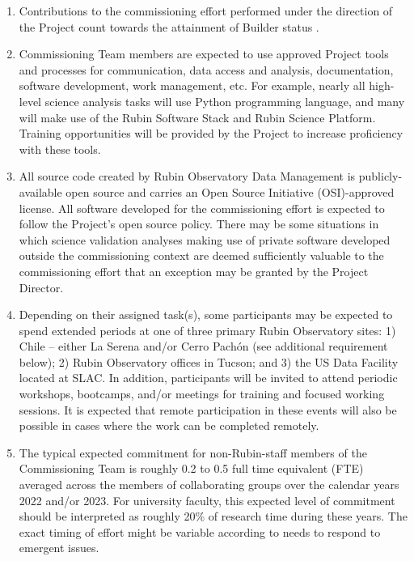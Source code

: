\documentclass[SE,authoryear,toc]{lsstdoc}
\begin{document}
\begin{enumerate}
\item Contributions to the commissioning effort performed under the direction of the Project count towards the attainment of Builder status .

\item Commissioning Team members are expected to use approved Project tools and processes for communication, data access and analysis, documentation, software development, work management, etc. For example, nearly all high-level science analysis tasks will use Python programming language, and many will make use of the Rubin Software Stack and Rubin Science Platform. Training opportunities will be provided by the Project to increase proficiency with these tools. 

\item All source code created by Rubin Observatory Data Management is publicly-available open source and carries an Open Source Initiative (OSI)-approved license. All software developed for the commissioning effort is expected to follow the Project's open source policy. There may be some situations in which science validation analyses making use of private software developed outside the commissioning context are deemed sufficiently valuable to the commissioning effort that an exception may be granted by the Project Director. 

\item Depending on their assigned task(s), some participants may be expected to spend extended periods at one of three primary Rubin Observatory sites: 1) Chile -- either La Serena and/or Cerro Pach\'{o}n (see additional requirement below); 2) Rubin Observatory offices in Tucson; and 3) the US Data Facility located at SLAC. In addition, participants will be invited to attend periodic workshops, bootcamps, and/or meetings for training and focused working sessions. It is expected that remote participation in these events will also be possible in cases where the work can be completed remotely.


\item The typical expected commitment for non-Rubin-staff members of the Commissioning Team is roughly 0.2 to 0.5 full time equivalent (FTE) averaged across the members of collaborating groups over the calendar years 2022 and/or 2023. For university faculty, this expected level of commitment should be interpreted as roughly 20\% of research time during these years. The exact timing of effort might be variable according to needs to respond to emergent issues. 


\end{enumerate}
\end{document}
